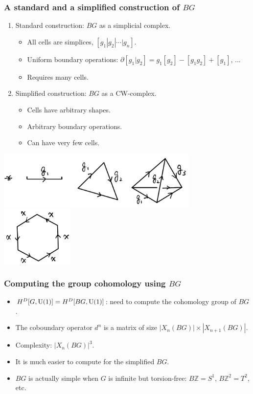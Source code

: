 \documentclass[xcolor=table, aspectratio=169,ignorenonframetext]{beamer}
\newcommand{\uone}{\text U(1)}
\begin{document}
\begin{frame}
	\frametitle{A standard and a simplified construction of $BG$}
	\begin{enumerate}
		\item Standard construction: $BG$ as a simplicial complex.
		\begin{itemize}
			\item All cells are simplices, $[g_1|g_2|\cdots|g_n]$.
			\item Uniform boundary operations:
			$\partial[g_1|g_2]=g_1[g_2]-[g_1g_2]+[g_1]$, ...
			\item Requires many cells.
		\end{itemize}
		\item Simplified construction: $BG$ as a CW-complex.
		\begin{itemize}
			\item Cells have arbitrary shapes.
			\item Arbitrary boundary operations.
			\item Can have very few cells.
		\end{itemize}
	\end{enumerate}
	\begin{center}
		\includegraphics[width=10cm]{../chainmap/bg-std}~~~~
		\includegraphics[height=3cm]{../chainmap/z6-1}
	\end{center}
\end{frame}

\begin{frame}
	\frametitle{Computing the group cohomology using $BG$}
	\begin{itemize}
		\item $H^D[G, \uone] = H^D[BG, \uone]$: need to compute the cohomology group of $BG$.
		\item The coboundary operator $d^n$ is a matrix of size $|X_n(BG)|\times |X_{n+1}(BG)|$.
		\item Complexity: $|X_n(BG)|^3$.
		\item It is much easier to compute for the simplified $BG$.
		\item $BG$ is actually simple when $G$ is infinite but torsion-free:
		$B\mathbb Z=S^1$, $B\mathbb Z^2=T^2$, etc.
	\end{itemize}
\end{frame}
\end{document}

